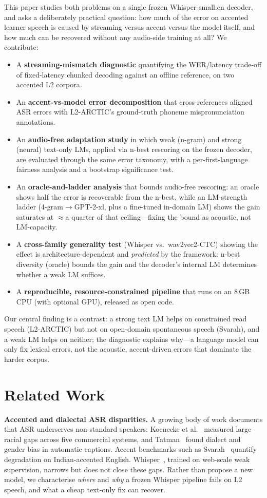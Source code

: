 \documentclass[conference]{IEEEtran}
\begin{document}
This paper studies both problems on a single frozen Whisper-small.en decoder, and asks a deliberately practical question: how much of the error on accented learner speech is caused by streaming versus accent versus the model itself, and how much can be recovered without any audio-side training at all? We contribute:
\begin{itemize}
\item A \textbf{streaming-mismatch diagnostic} quantifying the WER/latency trade-off of fixed-latency chunked decoding against an offline reference, on two accented L2 corpora.
\item An \textbf{accent-vs-model error decomposition} that cross-references aligned ASR errors with L2-ARCTIC's ground-truth phoneme mispronunciation annotations.
\item An \textbf{audio-free adaptation study} in which weak (n-gram) and strong (neural) text-only LMs, applied via n-best rescoring on the frozen decoder, are evaluated through the same error taxonomy, with a per-first-language fairness analysis and a bootstrap significance test.
\item An \textbf{oracle-and-ladder analysis} that bounds audio-free rescoring: an oracle shows half the error is recoverable from the n-best, while an LM-strength ladder (4-gram$\to$GPT-2-xl, plus a fine-tuned in-domain LM) shows the gain saturates at $\approx$a quarter of that ceiling---fixing the bound as acoustic, not LM-capacity.
\item A \textbf{cross-family generality test} (Whisper vs.\ wav2vec2-CTC) showing the effect is architecture-dependent and \emph{predicted} by the framework: n-best diversity (oracle) bounds the gain and the decoder's internal LM determines whether a weak LM suffices.
\item A \textbf{reproducible, resource-constrained pipeline} that runs on an 8\,GB CPU (with optional GPU), released as open code.
\end{itemize}
Our central finding is a contrast: a strong text LM helps on constrained read speech (L2-ARCTIC) but not on open-domain spontaneous speech (Svarah), and a weak LM helps on neither; the diagnostic explains why---a language model can only fix lexical errors, not the acoustic, accent-driven errors that dominate the harder corpus.

\section{Related Work}
\textbf{Accented and dialectal ASR disparities.} A growing body of work documents that ASR underserves non-standard speakers: Koenecke et al.~\cite{koenecke} measured large racial gaps across five commercial systems, and Tatman~\cite{tatman} found dialect and gender bias in automatic captions. Accent benchmarks such as Svarah~\cite{svarah} quantify degradation on Indian-accented English. Whisper~\cite{whisper}, trained on web-scale weak supervision, narrows but does not close these gaps. Rather than propose a new model, we characterise \emph{where} and \emph{why} a frozen Whisper pipeline fails on L2 speech, and what a cheap text-only fix can recover.
\end{document}
